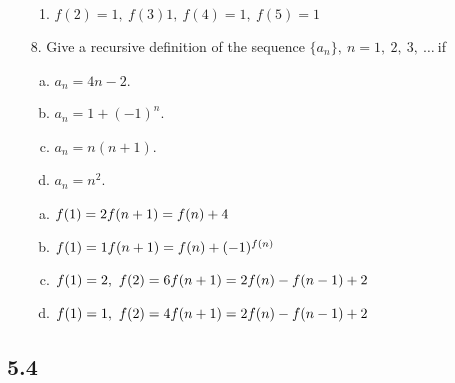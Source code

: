 \begin{itemize}
\begin{enumerate}
              \item $f(2)=1, \ f(3) 1, \ f(4) = 1, \ f(5) = 1$
          \end{enumerate}
    \item[8.]  Give a recursive definition of the sequence $\{a_n \},\ n = 1,\ 2,\ 3,\ \ldots\ $if
          \begin{enumerate}[a.]
              \item$a_n = 4n - 2.$
              \item$a_n = 1 + (-1)^n $.
              \item$a_n = n(n + 1)$.
              \item$a_n = n^2 $.
          \end{enumerate}
          \answer
          \begin{enumerate}[a.]
              \item $f(1) =2 \\ f(n+1) = f(n) +4$
              \item $f(1)=1\\f(n+1) = f(n) + (-1)^{f(n)}$
              \item $f(1) =2,\ f(2) = 6 \\ f(n+1) = 2f(n) -f(n-1) +2$
              \item $f(1) =1,\ f(2) = 4 \\ f(n+1) = 2f(n) -f(n-1) +2$
          \end{enumerate}


\end{itemize}

\subsection{5.4}
